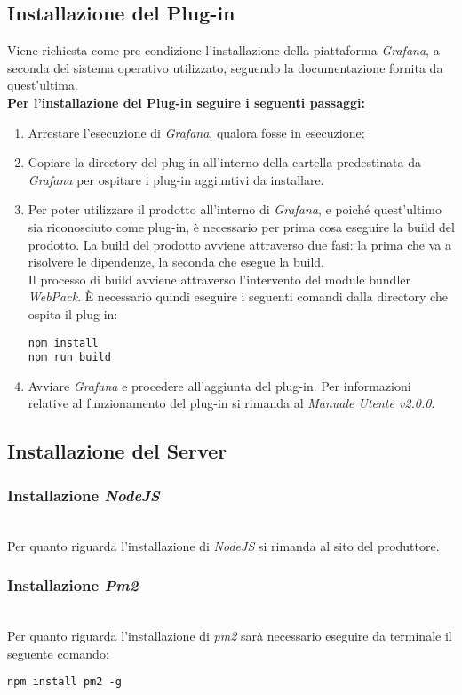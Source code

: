 \subsection{Installazione del Plug-in}
Viene richiesta come pre-condizione l'installazione della piattaforma \textit{Grafana}, a seconda del sistema operativo utilizzato, seguendo la documentazione fornita da quest'ultima.\\
\textbf{Per l'installazione del Plug-in seguire i seguenti passaggi:}
\begin{enumerate}
	\item Arrestare l'esecuzione di \textit{Grafana}, qualora fosse in esecuzione;	
	\item Copiare la directory del plug-in all'interno della cartella predestinata da \textit{Grafana} per ospitare i plug-in aggiuntivi da installare.
	\item Per poter utilizzare il prodotto all'interno di \textit{Grafana}, e poiché quest'ultimo sia riconosciuto come plug-in, è necessario per prima cosa eseguire la build del prodotto.
	La build del prodotto avviene attraverso due fasi: la prima che va a risolvere le dipendenze, la seconda che esegue la build.\\
	Il processo di build avviene attraverso l'intervento del module bundler \textit{WebPack}\glossario.
	È necessario quindi eseguire i seguenti comandi dalla directory che ospita il plug-in:
\begin{center}
	\texttt{npm install}\\
	\texttt{npm run build}
\end{center}
\item Avviare \textit{Grafana} e procedere all'aggiunta del plug-in.
Per informazioni relative al funzionamento del plug-in si rimanda al \textit{Manuale Utente v2.0.0}.
\end{enumerate}

\subsection{Installazione del Server}\label{installazione_server}
\subsubsection{Installazione \textit{NodeJS}}\-\\
Per quanto riguarda l'installazione di \textit{NodeJS} si rimanda al sito del produttore.

\subsubsection{Installazione \textit{Pm2}}\-\\
Per quanto riguarda l'installazione di \textit{pm2} sarà necessario eseguire da terminale il seguente comando:
\begin{center}
	\texttt{npm install pm2 -g}
\end{center}
	
